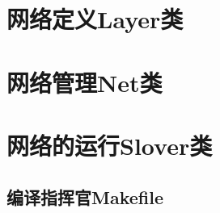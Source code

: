 \documentclass{NanCNBook}
\begin{document}
\chapter{网络定义Layer类}

\chapter{网络管理Net类}

\chapter{网络的运行Slover类}



\begin{cnappendix}
\chapter{编译指挥官Makefile}

\end{cnappendix}
\end{document}
